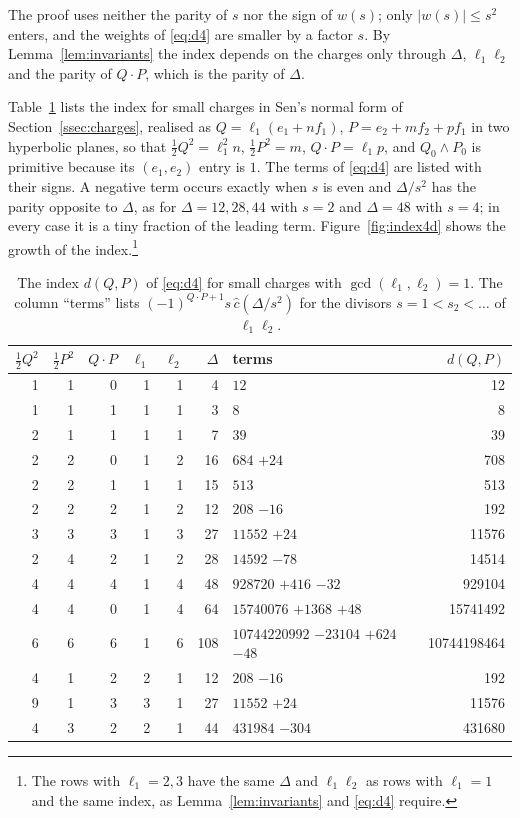 \documentclass[11pt]{amsart}
\theoremstyle{definition}
\newcommand{\cc}{\hat c}
\begin{document}
The proof uses neither the parity of $s$ nor the sign of $w(s)$; only $|w(s)|\le s^2$ enters, and the weights of \eqref{eq:d4} are smaller by a factor $s$. By Lemma~\ref{lem:invariants} the index depends on the charges only through $\Delta$, $\ell_1\ell_2$ and the parity of $Q\cdot P$, which is the parity of $\Delta$.

Table~\ref{tab:ex4d} lists the index for small charges in Sen's normal form of Section~\ref{ssec:charges}, realised as $Q=\ell_1(e_1+nf_1)$, $P=e_2+mf_2+pf_1$ in two hyperbolic planes, so that $\frac12Q^2=\ell_1^2n$, $\frac12P^2=m$, $Q\cdot P=\ell_1p$, and $Q_0\wedge P_0$ is primitive because its $(e_1,e_2)$ entry is $1$. The terms of \eqref{eq:d4} are listed with their signs. A negative term occurs exactly when $s$ is even and $\Delta/s^2$ has the parity opposite to $\Delta$, as for $\Delta=12,28,44$ with $s=2$ and $\Delta=48$ with $s=4$; in every case it is a tiny fraction of the leading term. Figure~\ref{fig:index4d} shows the growth of the index.\footnote{The rows with $\ell_1=2,3$ have the same $\Delta$ and $\ell_1\ell_2$ as rows with $\ell_1=1$ and the same index, as Lemma~\ref{lem:invariants} and \eqref{eq:d4} require.}

\begin{table}[ht]\centering\footnotesize
\caption{The index $d(Q,P)$ of \eqref{eq:d4} for small charges with $\gcd(\ell_1,\ell_2)=1$. The column ``terms'' lists $(-1)^{Q\cdot P+1}s\,\cc(\Delta/s^2)$ for the divisors $s=1<s_2<\dots$ of $\ell_1\ell_2$.}\label{tab:ex4d}
\begin{tabular}{@{}rrrrrrlr@{}}\toprule
$\frac12Q^2$ & $\frac12P^2$ & $Q\cdot P$ & $\ell_1$ & $\ell_2$ & $\Delta$ & terms & $d(Q,P)$\\\midrule
1 & 1 & 0 & 1 & 1 & 4 & $12$ & 12\\
1 & 1 & 1 & 1 & 1 & 3 & $8$ & 8\\
2 & 1 & 1 & 1 & 1 & 7 & $39$ & 39\\
2 & 2 & 0 & 1 & 2 & 16 & $684$ $+24$ & 708\\
2 & 2 & 1 & 1 & 1 & 15 & $513$ & 513\\
2 & 2 & 2 & 1 & 2 & 12 & $208$ $-16$ & 192\\
3 & 3 & 3 & 1 & 3 & 27 & $11552$ $+24$ & 11576\\
2 & 4 & 2 & 1 & 2 & 28 & $14592$ $-78$ & 14514\\
4 & 4 & 4 & 1 & 4 & 48 & $928720$ $+416$ $-32$ & 929104\\
4 & 4 & 0 & 1 & 4 & 64 & $15740076$ $+1368$ $+48$ & 15741492\\
6 & 6 & 6 & 1 & 6 & 108 & $10744220992$ $-23104$ $+624$ $-48$ & 10744198464\\
4 & 1 & 2 & 2 & 1 & 12 & $208$ $-16$ & 192\\
9 & 1 & 3 & 3 & 1 & 27 & $11552$ $+24$ & 11576\\
4 & 3 & 2 & 2 & 1 & 44 & $431984$ $-304$ & 431680\\
\bottomrule\end{tabular}\end{table}
\end{document}
